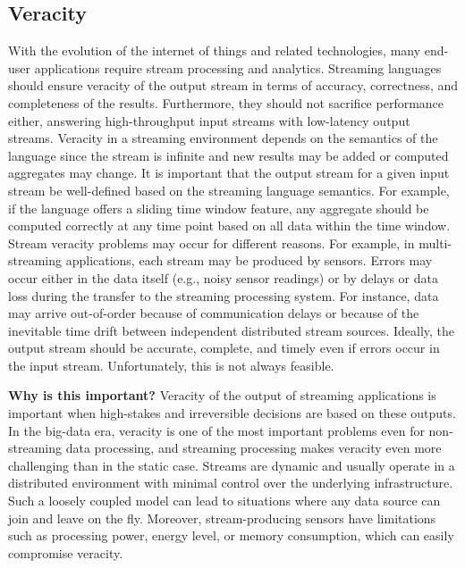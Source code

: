 \subsection{Veracity}\label{sec:veracity}



With the evolution of the internet of things and related technologies,
many end-user applications require stream processing and analytics.
Streaming languages should ensure veracity of the output stream in
terms of accuracy, correctness, and completeness of the results.
Furthermore, they should not sacrifice performance either, answering
high-throughput input streams with low-latency output streams.
Veracity in a streaming environment depends on the semantics of the
language since the stream is infinite and new results may be added or
computed aggregates may change. It is important that the output stream
for a given input stream be well-defined based on the streaming
language semantics. For example, if the language offers a sliding
time window feature, any aggregate should be computed correctly at
any time point based on all data within the time window.
%
Stream veracity problems may occur for different reasons. For example,
in multi-streaming applications, each stream may be produced by
sensors. Errors may occur either in the data itself (e.g., noisy
sensor readings) or by delays or data loss during the transfer to the
streaming processing system. For instance, data may arrive
out-of-order because of communication delays or because of the
inevitable time drift between independent distributed stream sources.
Ideally, the output stream should be accurate, complete, and timely
even if errors occur in the input stream.  Unfortunately, this is not
always feasible.

\textbf{Why is this important?}
%
Veracity of the output of streaming applications is important when
high-stakes and irreversible decisions are based on these outputs.  In
the big-data era, veracity is one of the most important problems even
for non-streaming data processing, and streaming processing makes
veracity even more challenging than in the static case. Streams are
dynamic and usually operate in a distributed environment
with minimal control over the underlying infrastructure. Such a
loosely coupled model can lead to situations where any data source can
join and leave on the fly. Moreover, stream-producing sensors
have limitations such as processing power, energy level, or memory
consumption, which can easily compromise veracity.

